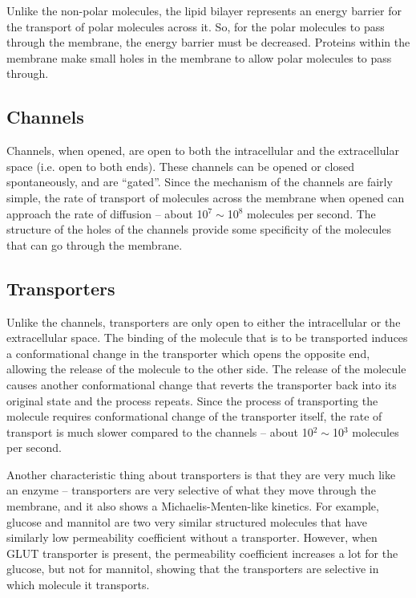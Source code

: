 \documentclass[a4paper, 12pt]{report}
\begin{document}
Unlike the non-polar molecules, the lipid bilayer represents an energy barrier for the transport of polar molecules across it.
So, for the polar molecules to pass through the membrane, the energy barrier must be decreased.
Proteins within the membrane make small holes in the membrane to allow polar molecules to pass through.

\subsection{Channels}

Channels, when opened, are open to both the intracellular and the extracellular space (i.e. open to both ends).
These channels can be opened or closed spontaneously, and are ``gated''.
Since the mechanism of the channels are fairly simple, the rate of transport of molecules across the membrane when opened can approach the rate of diffusion -- about 10$^7\sim$10$^8$ molecules per second.
The structure of the holes of the channels provide some specificity of the molecules that can go through the membrane.

\subsection{Transporters}

Unlike the channels, transporters are only open to either the intracellular or the extracellular space.
The binding of the molecule that is to be transported induces a conformational change in the transporter which opens the opposite end, allowing the release of the molecule to the other side.
The release of the molecule causes another conformational change that reverts the transporter back into its original state and the process repeats.
Since the process of transporting the molecule requires conformational change of the transporter itself, the rate of transport is much slower compared to the channels -- about 10$^2\sim$10$^3$ molecules per second.

Another characteristic thing about transporters is that they are very much like an enzyme -- transporters are very selective of what they move through the membrane, and it also shows a Michaelis-Menten-like kinetics.
For example, glucose and mannitol are two very similar structured molecules that have similarly low permeability coefficient without a transporter.
However, when GLUT transporter is present, the permeability coefficient increases a lot for the glucose, but not for mannitol, showing that the transporters are selective in which molecule it transports.
\end{document}
